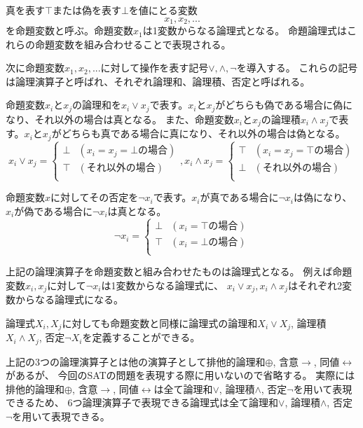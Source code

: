 \documentclass[titlepage]{jsarticle}
\begin{document}
真を表す$\top$または偽を表す$\bot$を値にとる変数
\[
x_1, x_2, ...
\]
を命題変数と呼ぶ。命題変数$x_1$は1変数からなる論理式となる。
命題論理式はこれらの命題変数を組み合わせることで表現される。

次に命題変数$x_1, x_2, ...$に対して操作を表す記号$\lor, \land, \neg$を導入する。
これらの記号は論理演算子と呼ばれ、それぞれ論理和、論理積、否定と呼ばれる。

命題変数$x_i$と$x_j$の論理和を$x_i \lor x_j$で表す。$x_i$と$x_j$がどちらも偽である場合に偽になり、それ以外の場合は真となる。
また、命題変数$x_i$と$x_j$の論理積$x_i \land x_j$で表す。$x_i$と$x_j$がどちらも真である場合に真になり、それ以外の場合は偽となる。
\[
	x_i \lor x_j = 
	\begin{cases}
		\bot & (x_i=x_j=\bot{の場合}) \\
		\top & ({それ以外の場合}) \\
	\end{cases}
	, 
	x_i \land x_j = 
	\begin{cases}
		\top & (x_i=x_j=\top{の場合}) \\
		\bot & ({それ以外の場合}) \\
	\end{cases}
\]

命題変数$x$に対してその否定を$\neg x_i$で表す。$x_i$が真である場合に$\neg x_i$は偽になり、$x_i$が偽である場合に$\neg x_i$は真となる。
\[
	\neg x_i =
	\begin{cases}
		\bot & (x_i=\top{の場合}) \\
		\top & (x_i=\bot{の場合}) \\
	\end{cases}
\]

上記の論理演算子を命題変数と組み合わせたものは論理式となる。
例えば命題変数$x_i, x_j$に対して$\neg x_i$は1変数からなる論理式に、
$x_i \lor x_j, x_i \land x_j$はそれぞれ2変数からなる論理式になる。

論理式$X_i, X_j$に対しても命題変数と同様に論理式の論理和$X_i \lor X_j$, 論理積$X_i \land X_j$, 否定$\neg X_i$を定義することができる。

上記の3つの論理演算子とは他の演算子として排他的論理和$\oplus$, 含意$\to$, 同値$\leftrightarrow$があるが、
今回のSATの問題を表現する際に用いないので省略する。
実際には排他的論理和$\oplus$, 含意$\to$, 同値$\leftrightarrow$は全て論理和$\lor$, 論理積$\land$, 否定$\neg$を用いて表現できるため、
6つ論理演算子で表現できる論理式は全て論理和$\lor$, 論理積$\land$, 否定$\neg$を用いて表現できる。
\end{document}
